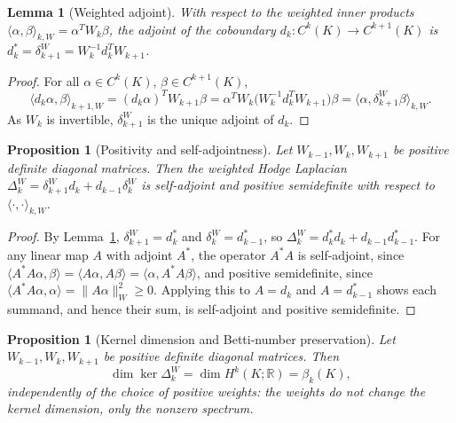 \documentclass[11pt]{amsart}
\theoremstyle{plain}
\newtheorem{proposition}[theorem]{Proposition}
\newtheorem{lemma}[theorem]{Lemma}
\newcommand{\R}{\mathbb{R}}
\begin{document}
\begin{lemma}[Weighted adjoint]
\label{lem:adjoint}
With respect to the weighted inner products $\langle\alpha,\beta\rangle_{k,W}=\alpha^TW_k\beta$, the
adjoint of the coboundary $d_k:C^k(K)\to C^{k+1}(K)$ is $d_k^{*}=\delta_{k+1}^{W}=W_k^{-1}d_k^{T}W_{k+1}$.
\end{lemma}

\begin{proof}
For all $\alpha\in C^k(K)$, $\beta\in C^{k+1}(K)$,
\[
\langle d_k\alpha,\beta\rangle_{k+1,W}
=(d_k\alpha)^T W_{k+1}\beta
=\alpha^T W_k\bigl(W_k^{-1}d_k^T W_{k+1}\bigr)\beta
=\langle\alpha,\delta_{k+1}^{W}\beta\rangle_{k,W}.
\]
As $W_k$ is invertible, $\delta_{k+1}^{W}$ is the unique adjoint of $d_k$.
\end{proof}

\begin{proposition}[Positivity and self-adjointness]
\label{prop:selfadjoint}
Let $W_{k-1},W_k,W_{k+1}$ be positive definite diagonal matrices. Then the weighted Hodge Laplacian
$\Delta_k^W=\delta_{k+1}^{W}d_k+d_{k-1}\delta_k^{W}$ is self-adjoint and positive semidefinite with
respect to $\langle\cdot,\cdot\rangle_{k,W}$.
\end{proposition}

\begin{proof}
By Lemma~\ref{lem:adjoint}, $\delta_{k+1}^{W}=d_k^{*}$ and $\delta_k^{W}=d_{k-1}^{*}$, so
$\Delta_k^W=d_k^{*}d_k+d_{k-1}d_{k-1}^{*}$. For any linear map $A$ with adjoint $A^{*}$, the operator
$A^{*}A$ is self-adjoint, since $\langle A^{*}A\alpha,\beta\rangle=\langle A\alpha,A\beta\rangle
=\langle\alpha,A^{*}A\beta\rangle$, and positive semidefinite, since
$\langle A^{*}A\alpha,\alpha\rangle=\|A\alpha\|_W^2\ge0$. Applying this to $A=d_k$ and $A=d_{k-1}^{*}$
shows each summand, and hence their sum, is self-adjoint and positive semidefinite.
\end{proof}

\begin{proposition}[Kernel dimension and Betti-number preservation]
\label{prop:homology}
Let $W_{k-1},W_k,W_{k+1}$ be positive definite diagonal matrices. Then
\[
\dim\ker\Delta_k^W=\dim H^k(K;\R)=\beta_k(K),
\]
independently of the choice of positive weights: the weights do not change the kernel dimension,
only the nonzero spectrum.
\end{proposition}
\end{document}
